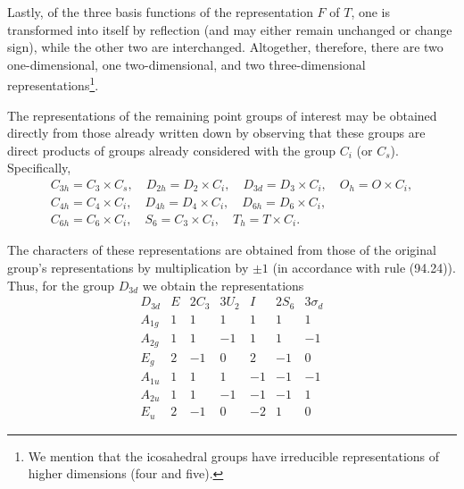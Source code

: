 Lastly, of the three basis functions of the representation $F$ of $T$, one is transformed into itself by reflection (and may either remain unchanged or change sign), while the other two are interchanged. Altogether, therefore, there are two one-dimensional, one two-dimensional, and two three-dimensional representations\footnote{We mention that the icosahedral groups have irreducible representations of higher dimensions (four and five).}.

The representations of the remaining point groups of interest may be obtained directly from those already written down by observing that these groups are direct products of groups already considered with the group $C_i$ (or $C_s$). Specifically,
\[
\begin{gathered}
C_{3h}=C_3\times C_s,\quad D_{2h}=D_2\times C_i,\quad D_{3d}=D_3\times C_i,\quad O_h=O\times C_i,\\
C_{4h}=C_4\times C_i,\quad D_{4h}=D_4\times C_i,\quad D_{6h}=D_6\times C_i,\\
C_{6h}=C_6\times C_i,\quad S_6=C_3\times C_i,\quad T_h=T\times C_i.
\end{gathered}
\]



The characters of these representations are obtained from those of the original group's representations by multiplication by $\pm1$ (in accordance with rule (94.24)). Thus, for the group $D_{3d}$ we obtain the representations
\[
\begin{array}{c|rrrrrr}
D_{3d}&E&2C_3&3U_2&I&2S_6&3\sigma_d\\\hline
A_{1g}&1&1&1&1&1&1\\ A_{2g}&1&1&-1&1&1&-1\\ E_g&2&-1&0&2&-1&0\\
A_{1u}&1&1&1&-1&-1&-1\\ A_{2u}&1&1&-1&-1&-1&1\\ E_u&2&-1&0&-2&1&0
\end{array}
\]
